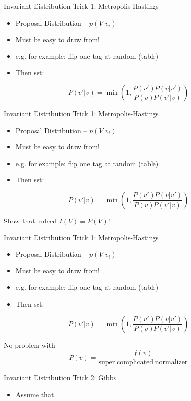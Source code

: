 \documentclass[11pt]{beamer}
\begin{document}
	\begin{frame}{Invariant Distribution Trick 1: Metropolis-Hastings}
		\begin{itemize}
			\item Proposal Distribution -- $p(V|v_i)$
			\item Must be easy to draw from!
			\item e.g. for example: flip one tag at random (table)
			\item Then set:
		\end{itemize}
		
		$$P(v'|v) = \min\left(1,\frac{P(v')P(v|v')}{P(v)P(v'|v)}\right)$$
	\end{frame}
	
	\begin{frame}{Invariant Distribution Trick 1: Metropolis-Hastings}
		\begin{itemize}
			\item Proposal Distribution -- $p(V|v_i)$
			\item Must be easy to draw from!
			\item e.g. for example: flip one tag at random (table)
			\item Then set:
		\end{itemize}
		
		$$P(v'|v) = \min\left(1,\frac{P(v')P(v|v')}{P(v)P(v'|v)}\right)$$
		
		\vspace{10pt} Show that indeed $I(V) = P(V)$!
	\end{frame}
	
	\begin{frame}{Invariant Distribution Trick 1: Metropolis-Hastings}
		\begin{itemize}
			\item Proposal Distribution -- $p(V|v_i)$
			\item Must be easy to draw from!
			\item e.g. for example: flip one tag at random (table)
			\item Then set:
		\end{itemize}
		
		$$P(v'|v) = \min\left(1,\frac{P(v')P(v|v')}{P(v)P(v'|v)}\right)$$
		
		\vspace{10pt} No problem with $$P(v) = \frac{f(v)}{\mbox{super complicated normalizer}}$$
	\end{frame}
	
	\begin{frame}{Invariant Distribution Trick 2: Gibbs}
		\begin{itemize}
			\item Assume that 
		\end{itemize}
		
		
		
		
		
	\end{frame}
	
	
\end{document}

